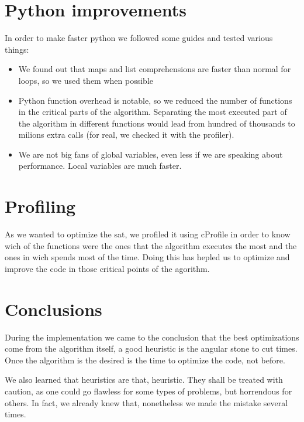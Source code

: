 \documentclass{article}
\begin{document}
\section{Python improvements}
In order to make faster python we followed some guides and tested various things:
\begin{itemize}
	\item We found out that maps and list comprehensions are faster than normal for loops, so we used
	them when possible
	\item Python function overhead is notable, so we reduced the number of functions in the critical
	parts of the algorithm. Separating the most executed part of the algorithm in different functions 
	would lead from hundred of thousands to milions extra calls (for real, we checked it with the
	profiler).
	\item We are not big fans of global variables, even less if we are speaking about performance. Local
	variables are much faster.
\end{itemize} 
%
\section{Profiling}
%
As we wanted to optimize the sat, we profiled it using cProfile in order to know wich of the functions were the ones that the algorithm executes the most and the ones in wich spends most of the time. Doing this has hepled us to optimize and improve the code in those critical points of the agorithm.
\section{Conclusions}
During the implementation we came to the conclusion that the best optimizations come from the algorithm
itself, a good heuristic is the angular stone to cut times. 
Once the algorithm is the desired is the time to optimize the code, not before.

We also learned that heuristics are that, heuristic. They shall be treated with caution, as one could
go flawless for some types of problems, but horrendous for others. In fact, we already knew that, nonetheless
we made the mistake several times.
\end{document}
